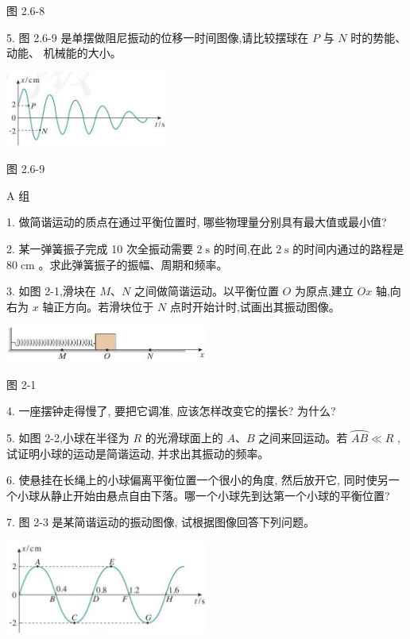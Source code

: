 \documentclass[10pt]{article}
\begin{document}
图 2.6-8

5. 图 2.6-9 是单摆做阻尼振动的位移一时间图像,请比较摆球在 \(P\) 与 \(N\) 时的势能、动能、 机械能的大小。

\begin{center}
\includegraphics[max width=0.4\textwidth]{images/01910e4c-ebb8-7d2c-8f2f-2375bc1d2d12_63_372398.jpg}
\end{center}

图 2.6-9

A 组

1. 做简谐运动的质点在通过平衡位置时, 哪些物理量分别具有最大值或最小值?

2. 某一弹簧振子完成 10 次全振动需要 \(2\mathrm{\;s}\) 的时间,在此 \(2\mathrm{\;s}\) 的时间内通过的路程是 \({80}\mathrm{\;{cm}}\) 。求此弹簧振子的振幅、周期和频率。

3. 如图 2-1,滑块在 \(M\text{、}N\) 之间做简谐运动。以平衡位置 \(O\) 为原点,建立 \({Ox}\) 轴,向右为 \(x\) 轴正方向。若滑块位于 \(N\) 点时开始计时,试画出其振动图像。

\begin{center}
\includegraphics[max width=0.5\textwidth]{images/01910e4c-ebb8-7d2c-8f2f-2375bc1d2d12_64_387607.jpg}
\end{center}

图 2-1

4. 一座摆钟走得慢了, 要把它调准, 应该怎样改变它的摆长? 为什么?

5. 如图 2-2,小球在半径为 \(R\) 的光滑球面上的 \(A\text{、}B\) 之间来回运动。若 \(\overset{⏜}{AB} \ll R\) ,试证明小球的运动是简谐运动, 并求出其振动的频率。

6. 使悬挂在长绳上的小球偏离平衡位置一个很小的角度, 然后放开它, 同时使另一个小球从静止开始由悬点自由下落。哪一个小球先到达第一个小球的平衡位置?

7. 图 2-3 是某简谐运动的振动图像, 试根据图像回答下列问题。

\begin{center}
\includegraphics[max width=0.5\textwidth]{images/01910e4c-ebb8-7d2c-8f2f-2375bc1d2d12_64_519286.jpg}
\end{center}
\end{document}
